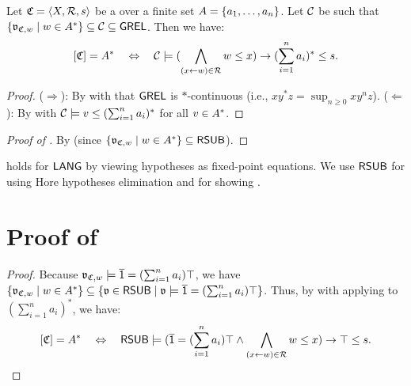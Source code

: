 \begin{lemma}\label{lemma: CFG encoding lang}
    Let $\mathfrak{C} = \langle X, \mathcal{R}, s\rangle$ be a  over a finite set $A = \{a_1, \dots, a_n\}$.
    Let $\algclass$ be such that $\set{\val_{\CFG, \word} \mid \word \in \CSIG^*} \subseteq \algclass \subseteq \GREL$.
    Then we have:
    \[\ljump{\CFG} = \CSIG^* \quad\Leftrightarrow\quad\algclass \models  (\bigwedge_{(x \leftarrow w) \in \mathcal{R}} w \le x) \to (\sum_{i = 1}^{n} a_i)^* \le s.\]
\end{lemma}
\begin{proof}
    ($\Rightarrow$):
    By  with that $\mathsf{GREL}$ is $*$-continuous (i.e., $\displaystyle x y^* z = \sup_{n \ge 0} x y^{n} z$).
    ($\Leftarrow$):
    By  with $\algclass \models \word[2] \le (\sum_{i = 1}^{n} a_i)^*$ for all $\word[2] \in \CSIG^*$.
\end{proof}
\begin{proof}[Proof of ]
    By  (since $\set{\val_{\CFG, \word} \mid \word \in \CSIG^*} \subseteq \RSUB$).
\end{proof}

\begin{remark}
     holds for $\mathsf{LANG}$ by viewing hypotheses as fixed-point equations.
    We use $\mathsf{RSUB}$ for using Hore hypotheses elimination  and for showing .
\end{remark}

\section{Proof of }\label{section: lemma: CFG and LANG star-free}
\begin{proof}
    Because $\val_{\CFG, \word} \models \com{\id} = (\sum_{i = 1}^{n} a_i) \top$, we have $\set{\val_{\CFG, \word} \mid \word \in \CSIG^*} \subseteq \set{\val \in \RSUB \mid \val \models \com{\id} = (\sum_{i = 1}^{n} a_i) \top}$.
    Thus, by  with applying  to $(\sum_{i = 1}^{n} a_i)^*$,
    we have:
    \[[ \mathfrak{C} ] = A^* \quad\Leftrightarrow\quad \mathsf{RSUB} \models (\overline{\mathsf{1}} = (\sum_{i = 1}^{n} a_i) \top \land \bigwedge_{(x \leftarrow w) \in \mathcal{R}} w \le x) \to \top \le s. \qedhere\] 
\end{proof}

